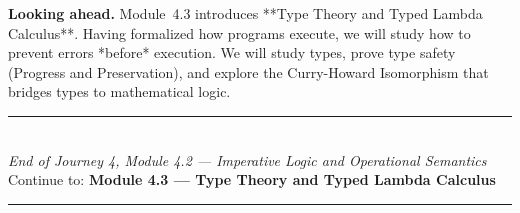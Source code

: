 \documentclass[12pt, a4paper]{book}
\begin{document}
\medskip
\noindent\textbf{Looking ahead.}
Module~4.3 introduces **Type Theory and Typed Lambda Calculus**. Having formalized how programs execute, we will study how to prevent errors *before* execution. We will study types, prove type safety (Progress and Preservation), and explore the Curry-Howard Isomorphism that bridges types to mathematical logic.

\vspace{1.4cm}
\begin{center}
{\color{JourneyColor}\rule{0.5\linewidth}{0.8pt}}\\[6pt]
{\small\color{JourneyColor}\textit{End of Journey 4, Module 4.2 --- Imperative Logic and Operational Semantics}}\\[4pt]
{\small\color{JourneyColor}Continue to: \textbf{Module 4.3 --- Type Theory and Typed Lambda Calculus}}\\[6pt]
{\color{JourneyColor}\rule{0.5\linewidth}{0.8pt}}
\end{center}
\end{document}
